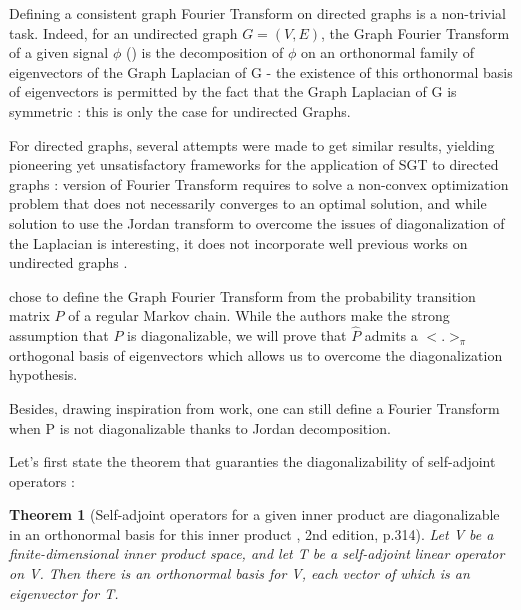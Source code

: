\documentclass[sn-mathphys]{sn-jnl}%
\theoremstyle{thmstyleone}%
\newtheorem{theo}{Theorem}[section]
\theoremstyle{thmstyletwo}%
\theoremstyle{thmstylethree}%
\begin{document}
Defining a consistent graph Fourier Transform on directed graphs is a
non-trivial task. Indeed, for an undirected graph $G=(V,E)$, the Graph
Fourier Transform of a given signal $\phi$
(\cite{ricaud_borgnat_tremblay_goncalves_vandergheynst_2019,
  shuman_narang_frossard_ortega_vandergheynst_2013}) is the
decomposition of $\phi$ on an orthonormal family of eigenvectors of
the Graph Laplacian of G - the existence of this orthonormal basis of
eigenvectors is permitted by the fact that the Graph Laplacian of G is
symmetric : this is only the case for undirected Graphs.

For directed graphs, several attempts \cite{sandryhaila_moura_2014,
  sardellitti_barbarossa_lorenzo_2017} were made to get similar
results, yielding pioneering yet unsatisfactory frameworks for the
application of SGT to directed graphs :
\cite{sardellitti_barbarossa_lorenzo_2017} version of Fourier
Transform requires to solve a non-convex optimization problem that
does not necessarily converges to an optimal solution, and while
\cite{sandryhaila_moura_2014} solution to use the Jordan transform to
overcome the issues of diagonalization of the Laplacian is
interesting, it does not incorporate well previous works on undirected
graphs \cite{shuman_narang_frossard_ortega_vandergheynst_2013,
  grinstead_snell_2006, chung_1997}.

\cite{sevi2019} chose to define the Graph Fourier Transform from the
probability transition matrix $P$ of a regular Markov chain. While the
authors make the strong assumption that $P$ is diagonalizable, we will
prove that $\hat{P}$ admits a $<.>_{\pi}$ orthogonal basis of
eigenvectors which allows us to overcome the diagonalization
hypothesis.

Besides, drawing inspiration from \cite{sandryhaila_moura_2014} work,
one can still define a Fourier Transform when P is not diagonalizable
thanks to Jordan decomposition.

Let's first state the theorem that guaranties the diagonalizability of
self-adjoint operators :

\begin{theo}[Self-adjoint operators for a given inner product are
  diagonalizable in an orthonormal basis for this inner product
  \cite{hoffman_kunze_1962}, 2nd edition,
  p.314]\label{theo:self_adjoint_operators}
  Let V be a finite-dimensional inner product space, and let T be a
  self-adjoint linear operator on V. Then there is an orthonormal
  basis for V, each vector of which is an eigenvector for T.
\end{theo}
\end{document}
